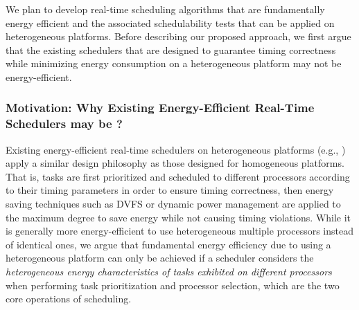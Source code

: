 We plan to develop real-time scheduling algorithms that are fundamentally energy efficient and the associated schedulability tests that can be applied on heterogeneous platforms. Before describing our proposed approach, we first argue that the existing schedulers that are designed to guarantee timing correctness while minimizing energy consumption on a heterogeneous platform may not be energy-efficient.

\subsubsection{Motivation: Why Existing Energy-Efficient Real-Time Schedulers may be ?} \label{sec:step1Motivation}


Existing energy-efficient real-time schedulers on heterogeneous platforms (e.g., \cite{liuenergy, colin2014energy}) apply a similar design philosophy as those designed for homogeneous platforms. That is, tasks are first prioritized and scheduled to different processors according to their timing parameters in order to ensure timing correctness, then energy saving techniques such as DVFS or dynamic power management are applied to the maximum degree to save energy while not causing timing violations. While it is generally more energy-efficient to use heterogeneous multiple processors instead of identical ones, we argue that fundamental energy efficiency due to using a heterogeneous platform can only be achieved if  a scheduler considers the \textit{heterogeneous energy characteristics of tasks exhibited on different processors} when performing task prioritization and processor selection, which are the two core operations of scheduling.




